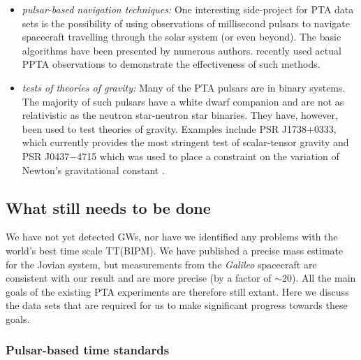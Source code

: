 \documentclass{raa}            %
\begin{document}
\begin{itemize}
\item \emph{pulsar-based navigation techniques:} One interesting side-project for PTA data sets is the possibility of using observations of millisecond pulsars to navigate spacecraft travelling through the solar system (or even beyond).  The basic algorithms have been presented by numerous authors.  \cite{dhy+13} recently used actual PPTA observations to demonstrate the effectiveness of such methods. 

\item \emph{tests of theories of gravity:} Many of the PTA pulsars are in binary systems.  The majority of such pulsars have a white dwarf companion and are not as relativistic as the neutron star-neutron star binaries.  They have, however, been used to test theories of gravity. Examples include PSR J1738$+$0333, which currently provides the most stringent test of scalar-tensor gravity \citep{fwe+12} and PSR J0437$-$4715 which was used to place a constraint on the variation of Newton's gravitational constant \citep{vbv+08}.


\end{itemize}

\subsection{What still needs to be done}\label{sec:whatNext}

We have not yet detected GWs, nor have we identified any problems with the world's best time scale TT(BIPM).  We have published a precise mass estimate for the Jovian system, but measurements from the \emph{Galileo} spacecraft are consistent with our result and are more precise (by a factor of $\sim$20).  All the main goals of the existing PTA experiments are therefore still extant.  Here we discuss the data sets that are required for us to make significant progress towards these goals.  

\subsubsection{Pulsar-based time standards}
\end{document}
